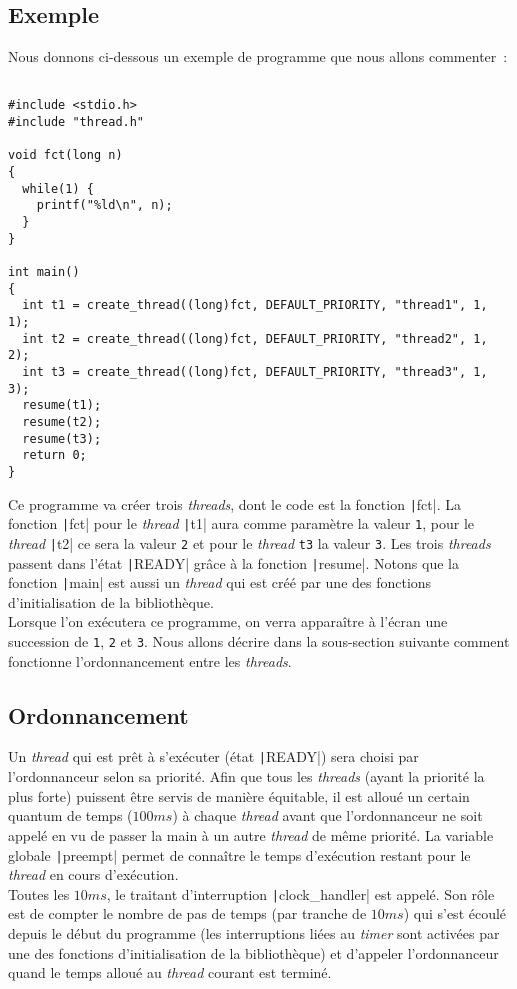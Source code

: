 \documentclass[a4paper]{article}
\begin{document}
\subsection{Exemple}

Nous donnons ci-dessous un exemple de programme que nous allons commenter~:
\begin{verbatim}

#include <stdio.h>
#include "thread.h"

void fct(long n)
{
  while(1) {
    printf("%ld\n", n);
  }
}

int main()
{
  int t1 = create_thread((long)fct, DEFAULT_PRIORITY, "thread1", 1, 1);
  int t2 = create_thread((long)fct, DEFAULT_PRIORITY, "thread2", 1, 2);
  int t3 = create_thread((long)fct, DEFAULT_PRIORITY, "thread3", 1, 3);
  resume(t1);
  resume(t2);
  resume(t3);
  return 0;
}

\end{verbatim}

Ce programme va créer trois \emph{threads}, dont le code est la fonction \texttt|fct|. La fonction \texttt|fct| pour le \emph{thread} \texttt|t1|
aura comme paramètre la valeur \verb+1+, pour le \emph{thread} \texttt|t2| ce sera la valeur \verb+2+ et pour le \emph{thread} \verb+t3+ 
la valeur \verb+3+. Les trois \emph{threads} passent dans l'état \texttt|READY| grâce 
à la fonction \texttt|resume|. Notons que la fonction \texttt|main| est aussi un \emph{thread} qui est créé par une des fonctions d'initialisation de la bibliothèque.\\
Lorsque l'on exécutera ce programme, on verra apparaître à l'écran une succession de \verb+1+, \verb+2+ et \verb+3+. Nous 
allons décrire dans la sous-section suivante comment fonctionne l'ordonnancement entre les \emph{threads}.

\subsection{Ordonnancement}

Un \emph{thread} qui est prêt à s'exécuter (état \texttt|READY|) sera choisi par l'ordonnanceur selon sa priorité. Afin que tous les 
\emph{threads} (ayant la priorité la plus forte) puissent être servis de manière équitable, il est alloué un certain quantum de temps ($100ms$)
à chaque \emph{thread} avant que l'ordonnanceur ne soit appelé en vu de passer la main à un autre \emph{thread} de même priorité. La variable
globale \texttt|preempt| permet de connaître le temps d'exécution restant pour le \emph{thread} en cours d'exécution.\\
Toutes les $10ms$, le traitant d'interruption \texttt|clock_handler| est appelé. Son rôle est de compter le nombre
de pas de temps (par tranche de $10ms$) qui s'est écoulé depuis le début du programme (les interruptions liées au \emph{timer} sont activées
par une des fonctions d'initialisation de la bibliothèque) et d'appeler l'ordonnanceur quand le temps alloué au \emph{thread} courant
est terminé.\\
\end{document}
